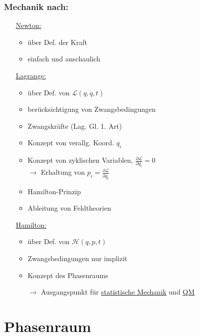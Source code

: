 \documentclass[titlepage,12pt,a4paper,ngerman]{report}
\newcommand{\lag}{\mathcal{L}}
\newcommand{\ham}{\mathcal{H}}
\begin{document}
{\subsubsection{Mechanik nach:}
\begin{itemize}
	\item[\underline{Newton:}] \begin{itemize}
		\item über Def. der Kraft
		\item einfach und anschaulich
	\end{itemize}
	\item[\underline{Lagrange:}] \begin{itemize}
		\item über Def. von $ \lag(q,\dot{q},t) $
		\item  berücksichtigung von Zwangsbedingungen
		\item Zwangskräfte (Lag. Gl. 1. Art)
		\item Konzept von verallg. Koord. $ q_i $
		\item Konzept von zyklischen Variablen, $ \frac{\partial \lag}{\partial q_i} = 0 $\\
		$ \rightarrow $ Erhaltung von $ p_i = \frac{\partial \lag}{\partial \dot q_i} $
		\item Hamilton-Prinzip
		\item Ableitung von Feldtheorien
	\end{itemize}
	\item[\underline{Hamilton:}] \begin{itemize}
		\item über Def. von $ \ham(q,p,t) $
		\item Zwangsbedingungen nur implizit
		\item Konzept des Phasenraums
		\item[$ \rightarrow $] Ausgangspunkt für \underline{statistische Mechanik} und \underline{QM}
	\end{itemize}
\end{itemize}
\section{Phasenraum}


}
\end{document}
